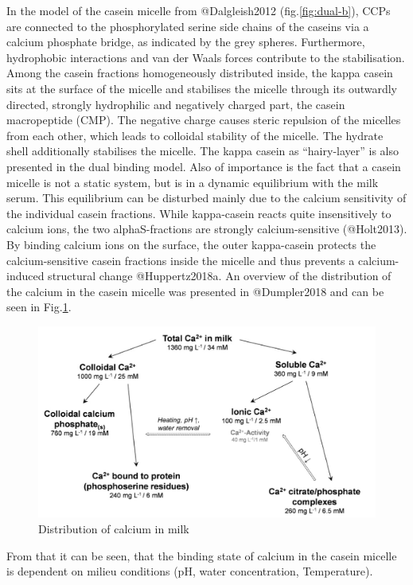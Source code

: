 \documentclass[
]{article}
\begin{document}
In the model of the casein micelle from @Dalgleish2012
(fig.\ref{fig:dual-b}), CCPs are connected to the phosphorylated serine
side chains of the caseins via a calcium phosphate bridge, as indicated
by the grey spheres. Furthermore, hydrophobic interactions and van der
Waals forces contribute to the stabilisation. Among the casein fractions
homogeneously distributed inside, the kappa casein sits at the surface
of the micelle and stabilises the micelle through its outwardly
directed, strongly hydrophilic and negatively charged part, the casein
macropeptide (CMP). The negative charge causes steric repulsion of the
micelles from each other, which leads to colloidal stability of the
micelle. The hydrate shell additionally stabilises the micelle. The
kappa casein as ``hairy-layer'' is also presented in the dual binding
model. Also of importance is the fact that a casein micelle is not a
static system, but is in a dynamic equilibrium with the milk serum. This
equilibrium can be disturbed mainly due to the calcium sensitivity of
the individual casein fractions. While kappa-casein reacts quite
insensitively to calcium ions, the two alphaS-fractions are strongly
calcium-sensitive (@Holt2013). By binding calcium ions on the surface,
the outer kappa-casein protects the calcium-sensitive casein fractions
inside the micelle and thus prevents a calcium-induced structural change
@Huppertz2018a. An overview of the distribution of the calcium in the
casein micelle was presented in @Dumpler2018 and can be seen in
Fig.\ref{fig:ca}.

\begin{figure}
\includegraphics[width=0.75\linewidth]{images/calcium_dumpler} \caption{Distribution of calcium in milk}\label{fig:ca}
\end{figure}

From that it can be seen, that the binding state of calcium in the
casein micelle is dependent on milieu conditions (pH, water
concentration, Temperature).
\end{document}
